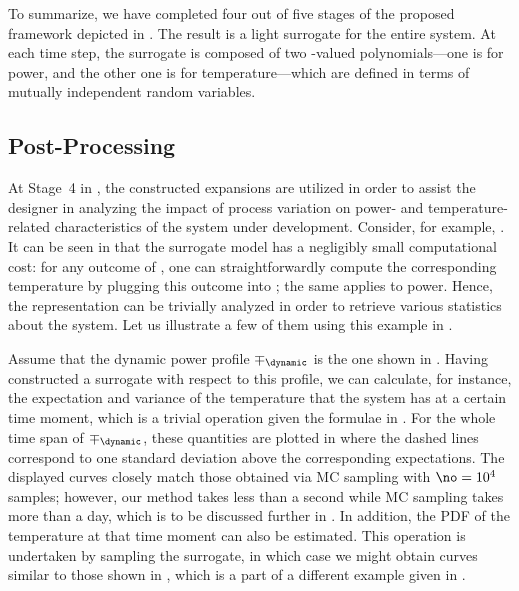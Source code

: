 To summarize, we have completed four out of five stages of the proposed
framework depicted in . The result is a light surrogate for
the entire system. At each time step, the surrogate is composed of two
\np-valued polynomials---one is for power, and the other one is for
temperature---which are defined in terms of \nz mutually independent random
variables.

\subsection{Post-Processing}

At Stage~4 in , the constructed expansions are utilized in
order to assist the designer in analyzing the impact of process variation on
power- and temperature-related characteristics of the system under development.
Consider, for example, . It can be seen in that
the surrogate model has a negligibly small computational cost: for any outcome
of \vz, one can straightforwardly compute the corresponding temperature by
plugging this outcome into ; the same applies to
power. Hence, the representation can be trivially analyzed in order to retrieve
various statistics about the system. Let us illustrate a few of them using this
example in .

Assume that the dynamic power profile $\mp_\dynamic$ is the one shown in
. Having constructed a surrogate with respect to
this profile, we can calculate, for instance, the expectation and variance of
the temperature that the system has at a certain time moment, which is a trivial
operation given the formulae in . For the whole time span of
$\mp_\dynamic$, these quantities are plotted in
 where the dashed lines correspond to one
standard deviation above the corresponding expectations. The displayed curves
closely match those obtained via \ac{MC} sampling with $\no = 10^4$ samples;
however, our method takes less than a second while \ac{MC} sampling takes more
than a day, which is to be discussed further in .
In addition, the \ac{PDF} of the temperature at that time moment can also be
estimated. This operation is undertaken by sampling the surrogate, in which case
we might obtain curves similar to those shown in
, which is a part of a different example given
in .
